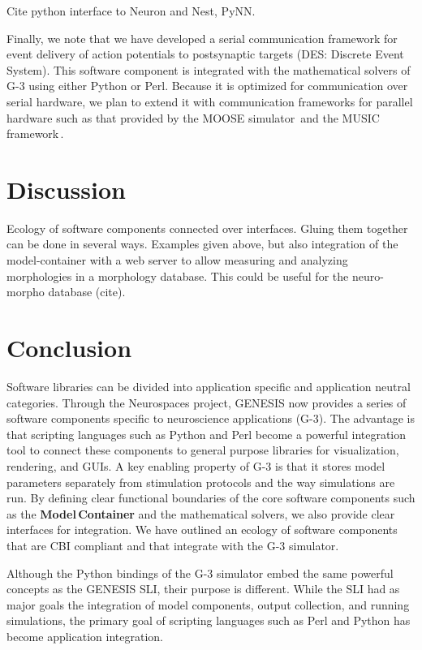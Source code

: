 \documentclass[12pt]{article}
\begin{document}
Cite python interface to Neuron and Nest, PyNN.

Finally, we note that we have developed a serial communication
framework for event delivery of action potentials to postsynaptic
targets (DES: Discrete Event System).  This software component is
integrated with the mathematical solvers of G-3 using either Python or
Perl.  Because it is optimized for communication over serial hardware,
we plan to extend it with communication frameworks for parallel
hardware such as that provided by the MOOSE
simulator\,\cite{ray08:_pymoos} and the MUSIC
framework\,\cite{ekeberg08:_music_multis_coord}.


\pagebreak
\section{Discussion}

Ecology of software components connected over interfaces.  Gluing them
together can be done in several ways.  Examples given above, but also
integration of the model-container with a web server to allow
measuring and analyzing morphologies in a morphology database.  This
could be useful for the neuro-morpho database (cite).

\section{Conclusion}

Software libraries can be divided into application specific and
application neutral categories.  Through the Neurospaces project,
GENESIS now provides a series of software components specific to
neuroscience applications (G-3).  The advantage is that scripting
languages such as Python and Perl become a powerful integration tool
to connect these components to general purpose libraries for
visualization, rendering, and GUIs.  A key enabling property of G-3 is
that it stores model parameters separately from stimulation protocols
and the way simulations are run.  By defining clear functional
boundaries of the core software components such as the {\bf
  Model\,Container} and the mathematical solvers, we also provide
clear interfaces for integration. We have outlined an ecology of
software components that are CBI compliant and that integrate with the
G-3 simulator.

Although the Python bindings of the G-3 simulator embed the same
powerful concepts as the GENESIS SLI, their purpose is different.
While the SLI had as major goals the integration of model components,
output collection, and running simulations, the primary goal of
scripting languages such as Perl and Python has become application
integration.
\end{document}
